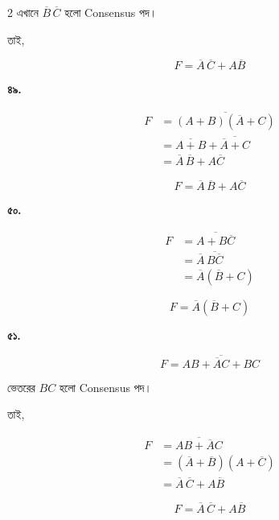 \begin{multicols}{2}
এখানে \(\overline B\,\overline C\) হলো
\textenglish{Consensus} পদ।

তাই,

\[
\boxed{F=\overline A\,\overline C+A\overline B}
\]

\medskip


\textbf{৪৯.}

\[
\begin{aligned}
F
&=\overline{(A+B)(\overline A+C)}\\
&=\overline{A+B}
+\overline{\overline A+C}\\
&=\overline A\,\overline B+A\overline C
\end{aligned}
\]

\[
\boxed{F=\overline A\,\overline B+A\overline C}
\]

\medskip


\textbf{৫০.}

\[
\begin{aligned}
F
&=\overline{A+B\overline C}\\
&=\overline A\,\overline{B\overline C}\\
&=\overline A(\overline B+C)
\end{aligned}
\]

\[
\boxed{F=\overline A(\overline B+C)}
\]

\medskip


\textbf{৫১.}

\[
F=\overline{AB+\overline AC+BC}
\]

ভেতরের \(BC\) হলো \textenglish{Consensus} পদ।

তাই,

\[
\begin{aligned}
F
&=\overline{AB+\overline AC}\\
&=(\overline A+\overline B)(A+\overline C)\\
&=\overline A\,\overline C+A\overline B
\end{aligned}
\]

\[
\boxed{F=\overline A\,\overline C+A\overline B}
\]

\medskip


\end{multicols}

